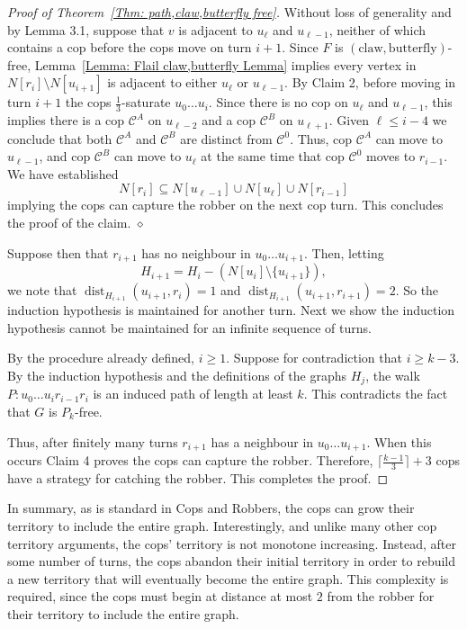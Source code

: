 \documentclass[12pt]{article}
\theoremstyle{definition}
\def\claw{\text{claw}}
\def\butterfly{\text{butterfly}}
\DeclareMathOperator{\dist}{dist}
\begin{document}
\begin{proof}[Proof of Theorem~\ref{Thm: path,claw,butterfly free}]
Without loss of generality and by Lemma 3.1, suppose that $v$ is adjacent to $u_\ell$ and $u_{\ell-1}$, 
neither of which contains a cop before the cops move on turn $i+1$.
Since $F$ is $(\claw,\butterfly)$-free, Lemma~\ref{Lemma: Flail claw,butterfly Lemma} implies 
every vertex in $N[r_i]\setminus N[u_{i+1}]$ is adjacent to either $u_\ell$ or $u_{\ell-1}$.
By Claim 2, before moving in turn $i+1$ the cops $\frac{1}{3}$-saturate $u_0\dots u_i$. Since there is no cop on $u_\ell$ and $u_{\ell-1}$, 
this implies there is a cop $\mathcal{C}^A$ on $u_{\ell-2}$ and a cop $\mathcal{C}^B$ on $u_{\ell+1}$.
Given $\ell \leq i-4$ we conclude that both  $\mathcal{C}^A$ and  $\mathcal{C}^B$ are distinct from  $\mathcal{C}^0$.
Thus, cop $\mathcal{C}^A$ can move to $u_{\ell-1}$, and cop $\mathcal{C}^B$ can move to $u_{\ell}$ 
at the same time that cop $\mathcal{C}^0$ moves to $r_{i-1}$.
We have established 
\[
N[r_i] \subseteq N[u_{\ell-1}] \cup N[u_{\ell}]  \cup N[r_{i-1}]
\]
implying the cops can capture the robber on the next cop turn.
This concludes the proof of the claim.
\hfill $\diamond$
\vspace{0.5cm}

Suppose then that $r_{i+1}$ has no neighbour in $u_0\dots u_{i+1}$.
Then, letting 
\[
H_{i+1} = H_i - (N[u_{i}]\setminus \{u_{i+1}\}),
\] we note that 
$\dist_{H_{i+1}}(u_{i+1},r_{i}) = 1$ and $\dist_{H_{i+1}}\left(u_{i+1},r_{i+1}\right) = 2$.
So the induction hypothesis is maintained for another turn.
Next we show the induction hypothesis cannot be maintained for an infinite sequence of turns.

By the procedure already defined, $i\geq 1$.
Suppose for contradiction that $i\geq k-3$.
By the induction hypothesis and the definitions of the graphs $H_j$, the walk $P: u_0\dots u_ir_{i-1} r_i$ 
is an induced path of length at least $k$.
This contradicts the fact that $G$ is $P_k$-free.


Thus, after
finitely many turns
$r_{i+1}$ has a neighbour in $u_0\dots u_{i+1}$.
When this occurs Claim 4 proves the cops can capture the robber.
Therefore, $\lceil\frac{k-1}{3}\rceil+3$ cops have a strategy for catching the robber.
This completes the proof.
\end{proof}

In summary,
as is standard in Cops and Robbers, the cops can grow their territory to include the entire graph. 
Interestingly, and unlike many other cop territory arguments, 
the cops' territory is not monotone increasing. 
Instead, after some number of turns, the cops abandon their initial territory
in order to rebuild a new territory that will eventually become the entire graph.
This complexity is required, since the cops must begin at distance at most $2$ from the robber 
for their territory to include the entire graph.
\end{document}
